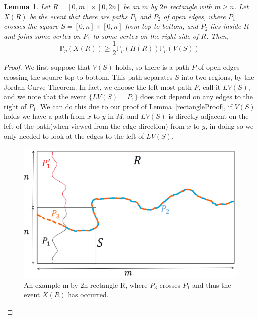 \documentclass[a4paper,11pt]{article}
\newtheorem{lemma}[theorem]{Lemma}
\theoremstyle{definition}
\newcommand{\prob}{\mathbb{P}_p}
\begin{document}
\begin{lemma}\label{mby2nLemma}
	Let $R = [0,m]\times[0,2n]$ be an $m$ by $2n$ rectangle with $m\geq n$. Let $X(R)$ be the event that there are paths $P_1$ and $P_2$ of open edges, where $P_1$ crosses the square $S = [0,n]\times[0,n]$ from top to bottom, and $P_2$ lies inside $R$ and joins some vertex on $P_1$ to some vertex on the right side of $R$. Then, 
	$$\prob(X(R))\geq \frac{1}{2}\prob(H(R))\prob(V(S))$$
\end{lemma}
\begin{proof}
	We first suppose that $V(S)$ holds, so there is a path $P$ of open edges crossing the square top to bottom. This path separates $S$ into two regions, by the Jordan Curve Theorem. In fact, we choose the left most path $P$, call it $LV(S)$, and we note that the event $\{LV(S) = P_1\}$ does not depend on any edges to the right of $P_1$. We can do this due to our proof of Lemma~\ref{rectangleProof}, if $V(S)$ holds we have a path from $x$ to $y$ in $M$, and $LV(S)$ is directly adjacent on the left of the path(when viewed from the edge direction) from $x$ to $y$, in doing so we only needed to look at the edges to the left of $LV(S)$.

	\begin{figure}
		\centering
		\includegraphics[scale=0.4]{drawings/2nbymRectangle.png}
		\caption{An example m by 2n rectangle R, where $P_3$ crosses $P_1$ and thus the event $X(R)$ has occurred.}
		\label{fig:2nbymProof}
	\end{figure}


\end{proof}
\end{document}

